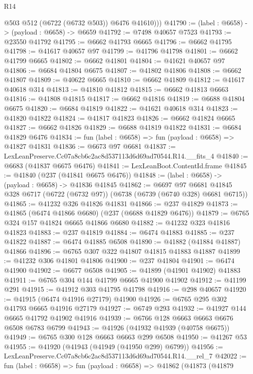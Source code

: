 \begin{lexlean}{R14}
\begin{coremodule}
          @503
          @512
          (@6722 (@6732 @503))
          @6476
          @41610)))
@41790 := (label : @6658) -> (payload : @6658) -> @6659
@41792 := @7498 @40657 @7523
@41793 := @23550 @41792
@41795 := @6662 @41793 @6665
@41796 := @6662 @41795
@41798 := @41617 @40657 @97
@41799 := @41796 @41798
@41801 := @6662 @41799 @6665
@41802 := @6662 @41801
@41804 := @41621 @40657 @97
@41806 := @6684 @41804 @6675
@41807 := @41802 @41806
@41808 := @6662 @41807
@41809 := @40622 @6665
@41810 := @6662 @41809
@41812 := @41617 @40618 @314
@41813 := @41810 @41812
@41815 := @6662 @41813 @6663
@41816 := @41808 @41815
@41817 := @6662 @41816
@41819 := @6688 @41804 @6675
@41820 := @6684 @41819
@41822 := @41621 @40618 @314
@41823 := @41820 @41822
@41824 := @41817 @41823
@41826 := @6662 @41824 @6665
@41827 := @6662 @41826
@41829 := @6688 @41819 @41822
@41831 := @6684 @41829 @6476
@41834 := fun (label : @6658) => fun (payload : @6658) => @41827 @41831
@41836 := @6673 @97 @6681
@41837 := LexLeanPreserve.Cc07a8cb6c2ac8d537113d6d69ad70544.R14.__fits_4
@41840 := @6683 (@41837 @6675 @6476)
@41841 := LexLeanBoot.ContentId.frame
@41845 := @41840 (@237 (@41841 @6675 @6476))
@41848 := (label : @6658) -> (payload : @6658) -> @41836 @41845
@41862 := @6697
    @97
    @6681
    @41845
    @328
    @6717
    (@6722 (@6732 @97))
    (@6738 (@6739 (@6740 @328) @6681 @6715))
@41865 := @41232 @326 @41826 @41831
@41866 := @237 @41829
@41873 := @41865 (@6474 @41866 @6680) (@237 (@6688 @41829 @6476))
@41879 := @6765 @324 @157 @41824 @6665 @41866 @6680
@41882 := @41232 @323 @41816 @41823
@41883 := @237 @41819
@41884 := @6474 @41883
@41885 := @237 @41822
@41887 := @6474 @41885 @6508
@41890 := @41882 (@41884 @41887) @41866
@41896 := @6765 @307 @322 @41807 @41815 @41883 @41887
@41899 := @41232 @306 @41801 @41806
@41900 := @237 @41804
@41901 := @6474 @41900
@41902 := @6677 @6508
@41905 := @41899 (@41901 @41902) @41883
@41911 := @6765 @304 @144 @41799 @6665 @41900 @41902
@41912 := @41199 @291
@41915 := @41912 @303 @41795 @41798
@41916 := @298 @40657
@41920 := @41915 (@6474 @41916 @27179) @41900
@41926 := @6765 @295 @302 @41793 @6665 @41916 @27179
@41927 := @6749 @293
@41932 := @41927 @144 @6665 @41792 @41902 @41916
@41939 := @6766 @128 @6663 @6663 @6676 @6508 @6783 @6799
@41943 := @41926 (@41932 @41939 (@40758 @6675))
@41949 := @6765 @300 @128 @6663 @6663 @299 @6508
@41950 := @41267 @53
@41955 := @41920 (@41943 (@41949 (@41950 @299) @6799))
@41956 := LexLeanPreserve.Cc07a8cb6c2ac8d537113d6d69ad70544.R14.__rel_7
@42022 := fun (label : @6658) =>
  fun (payload : @6658) =>
  @41862
    (@41873
      (@41879

\end{coremodule}
\end{lexlean}
